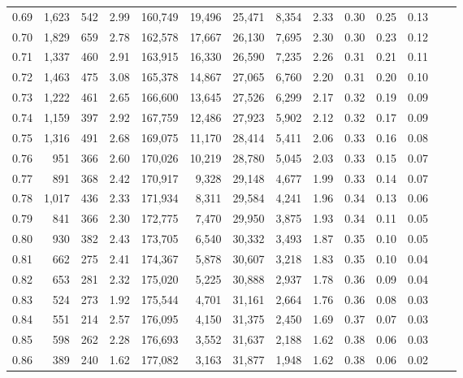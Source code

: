 \begin{tabular}{rrrrrrrrrrrrrr}
0.69 &  1,623 &  542 &    2.99 &  160,749 &   19,496 &  25,471 &   8,354 &  2.33 &  0.30 &  0.25 &      0.13 \\
0.70 &  1,829 &  659 &    2.78 &  162,578 &   17,667 &  26,130 &   7,695 &  2.30 &  0.30 &  0.23 &      0.12 \\
0.71 &  1,337 &  460 &    2.91 &  163,915 &   16,330 &  26,590 &   7,235 &  2.26 &  0.31 &  0.21 &      0.11 \\
0.72 &  1,463 &  475 &    3.08 &  165,378 &   14,867 &  27,065 &   6,760 &  2.20 &  0.31 &  0.20 &      0.10 \\
0.73 &  1,222 &  461 &    2.65 &  166,600 &   13,645 &  27,526 &   6,299 &  2.17 &  0.32 &  0.19 &      0.09 \\
0.74 &  1,159 &  397 &    2.92 &  167,759 &   12,486 &  27,923 &   5,902 &  2.12 &  0.32 &  0.17 &      0.09 \\
0.75 &  1,316 &  491 &    2.68 &  169,075 &   11,170 &  28,414 &   5,411 &  2.06 &  0.33 &  0.16 &      0.08 \\
0.76 &    951 &  366 &    2.60 &  170,026 &   10,219 &  28,780 &   5,045 &  2.03 &  0.33 &  0.15 &      0.07 \\
0.77 &    891 &  368 &    2.42 &  170,917 &    9,328 &  29,148 &   4,677 &  1.99 &  0.33 &  0.14 &      0.07 \\
0.78 &  1,017 &  436 &    2.33 &  171,934 &    8,311 &  29,584 &   4,241 &  1.96 &  0.34 &  0.13 &      0.06 \\
0.79 &    841 &  366 &    2.30 &  172,775 &    7,470 &  29,950 &   3,875 &  1.93 &  0.34 &  0.11 &      0.05 \\
0.80 &    930 &  382 &    2.43 &  173,705 &    6,540 &  30,332 &   3,493 &  1.87 &  0.35 &  0.10 &      0.05 \\
0.81 &    662 &  275 &    2.41 &  174,367 &    5,878 &  30,607 &   3,218 &  1.83 &  0.35 &  0.10 &      0.04 \\
0.82 &    653 &  281 &    2.32 &  175,020 &    5,225 &  30,888 &   2,937 &  1.78 &  0.36 &  0.09 &      0.04 \\
0.83 &    524 &  273 &    1.92 &  175,544 &    4,701 &  31,161 &   2,664 &  1.76 &  0.36 &  0.08 &      0.03 \\
0.84 &    551 &  214 &    2.57 &  176,095 &    4,150 &  31,375 &   2,450 &  1.69 &  0.37 &  0.07 &      0.03 \\
0.85 &    598 &  262 &    2.28 &  176,693 &    3,552 &  31,637 &   2,188 &  1.62 &  0.38 &  0.06 &      0.03 \\
0.86 &    389 &  240 &    1.62 &  177,082 &    3,163 &  31,877 &   1,948 &  1.62 &  0.38 &  0.06 &      0.02 \\

\end{tabular}
